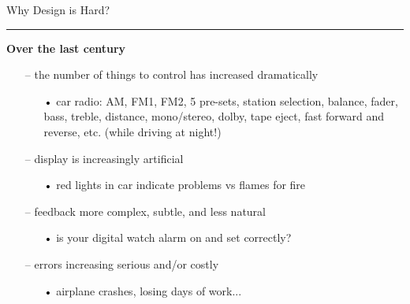 \documentclass[pdf]{beamer}
\begin{document}
\begin{frame}
	{Why Design is Hard?}{\textcolor{red}{\rule{12cm}{1.2pt}}}
	
\large{\textbf{Over the last century}}
 \smallskip
 
 \begin{itemize}
    \item[--] \small{the number of things to control has increased dramatically}
    \begin{itemize}
              \item[\textcolor{black}{•}] \footnotesize{car radio: AM, FM1, FM2, 5 pre-sets, station selection, balance, fader, bass, treble, distance, mono/stereo, dolby, tape eject, fast forward and reverse, etc. (while driving at night!)}
     \end{itemize}
     
      \bigskip
      \item[--] \small{display is increasingly artificial }
          \begin{itemize}
              \item[\textcolor{black}{•}] \footnotesize{}{ red lights in car indicate problems vs flames for fire}
     \end{itemize}
     
     \bigskip
     \item[--] \small{feedback more complex, subtle, and less natural}
          \begin{itemize}
              \item[\textcolor{black}{•}] \footnotesize{is your digital watch alarm on and set correctly?}
     \end{itemize}
     
      \bigskip
      \item[--] \small{errors increasing serious and/or costly }
      \begin{itemize}
              \item[\textcolor{black}{•}] \footnotesize{airplane crashes, losing days of work...}
     \end{itemize}
     
  \end{itemize}

\end{frame}
\end{document}
